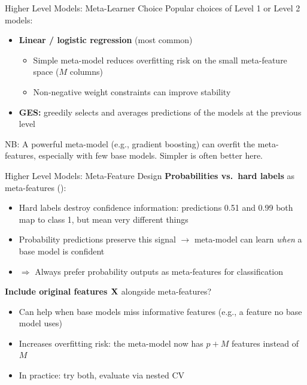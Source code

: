 \documentclass[11pt,compress,t,notes=noshow, xcolor=table]{beamer}
\begin{document}

\begin{vbframe}{Higher Level Models: Meta-Learner Choice}
\vfill
Popular choices of Level 1 or Level 2 models:
\begin{itemize}
    \item \textbf{Linear / logistic regression} (most common)
    \begin{itemize}
        \item Simple meta-model reduces overfitting risk on the small meta-feature space ($M$ columns)
        \item Non-negative weight constraints can improve stability
    \end{itemize}
    \item \textbf{GES:} greedily selects and averages predictions of the models at the previous level
\end{itemize}
\vfill
NB: A powerful meta-model (e.g., gradient boosting) can overfit the meta-features, especially with few base models. Simpler is often better here.
\vfill
\end{vbframe}


\begin{vbframe}{Higher Level Models: Meta-Feature Design}
\vfill
\textbf{Probabilities vs.\ hard labels} as meta-features ():
\begin{itemize}
    \item Hard labels destroy confidence information: predictions 0.51 and 0.99 both map to class 1, but mean very different things
    \item Probability predictions preserve this signal $\rightarrow$ meta-model can learn \emph{when} a base model is confident
    \item $\Rightarrow$ Always prefer probability outputs as meta-features for classification
\end{itemize}
\vfill
\textbf{Include original features $\mathbf{X}$} alongside meta-features?
\begin{itemize}
    \item Can help when base models miss informative features (e.g., a feature no base model uses)
    \item Increases overfitting risk: the meta-model now has $p + M$ features instead of $M$
    \item In practice: try both, evaluate via nested CV
\end{itemize}
\vfill
\end{vbframe}
\end{document}
